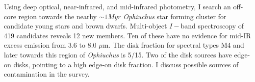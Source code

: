 \documentclass[12pt]{report}	%
\begin{document}
Using deep optical, near-infrared, and mid-infrared photometry, I search an off-core region towards the nearby $\sim1 Myr$ \emph{Ophiuchus} star forming cluster for candidate young stars and brown dwarfs.  Multi-object $I-$band spectroscopy of 419 candidates reveals 12 new members.  Ten of these have no evidence for mid-IR excess emission from 3.6 to 8.0 $\mu$m.  The disk fraction for spectral types M4 and later towards this region of \emph{Ophiuchus} is 5/15.  Two of the disk sources have edge-on disks, pointing to a high edge-on disk fraction.  I discuss possible sources of contamination in the survey.

\tableofcontents   %

\listoftables      %
\listoffigures     %



%
%










%
%
%
%


%
%
\end{document}
